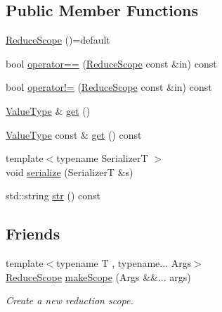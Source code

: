 \subsection*{Public Member Functions}
\begin{DoxyCompactItemize}
\item 
\hyperlink{structvt_1_1collective_1_1reduce_1_1detail_1_1_reduce_scope_ac1da975b48590fd29147a12ef1be3e56}{Reduce\+Scope} ()=default
\item 
bool \hyperlink{structvt_1_1collective_1_1reduce_1_1detail_1_1_reduce_scope_ae10b3887779309ee627921c794b0c4de}{operator==} (\hyperlink{structvt_1_1collective_1_1reduce_1_1detail_1_1_reduce_scope}{Reduce\+Scope} const \&in) const
\item 
bool \hyperlink{structvt_1_1collective_1_1reduce_1_1detail_1_1_reduce_scope_ac5023740d97cfbe4e617bc09e78a23d5}{operator!=} (\hyperlink{structvt_1_1collective_1_1reduce_1_1detail_1_1_reduce_scope}{Reduce\+Scope} const \&in) const
\item 
\hyperlink{structvt_1_1collective_1_1reduce_1_1detail_1_1_reduce_scope_a7abcfd8ab86f38734725fe77455e4838}{Value\+Type} \& \hyperlink{structvt_1_1collective_1_1reduce_1_1detail_1_1_reduce_scope_aaceb69a568f8a644c99b4cdd0769abab}{get} ()
\item 
\hyperlink{structvt_1_1collective_1_1reduce_1_1detail_1_1_reduce_scope_a7abcfd8ab86f38734725fe77455e4838}{Value\+Type} const  \& \hyperlink{structvt_1_1collective_1_1reduce_1_1detail_1_1_reduce_scope_a8eb7250d0fc83b45fa318f91bde27045}{get} () const
\item 
{\footnotesize template$<$typename SerializerT $>$ }\\void \hyperlink{structvt_1_1collective_1_1reduce_1_1detail_1_1_reduce_scope_a4b8b74530ce615997bec278690c12be8}{serialize} (SerializerT \&s)
\item 
std\+::string \hyperlink{structvt_1_1collective_1_1reduce_1_1detail_1_1_reduce_scope_a8fbbaff85c592424bedc8daf5fce7e02}{str} () const
\end{DoxyCompactItemize}
\subsection*{Friends}
\begin{DoxyCompactItemize}
\item 
{\footnotesize template$<$typename T , typename... Args$>$ }\\\hyperlink{structvt_1_1collective_1_1reduce_1_1detail_1_1_reduce_scope}{Reduce\+Scope} \hyperlink{structvt_1_1collective_1_1reduce_1_1detail_1_1_reduce_scope_affabcae30d44dc7901117edf23a14884}{make\+Scope} (Args \&\&... args)
\begin{DoxyCompactList}\small\item\em Create a new reduction scope. \end{DoxyCompactList}\end{DoxyCompactItemize}


